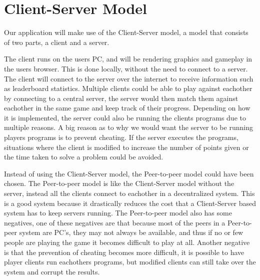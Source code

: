 \section{Client-Server Model}
Our application will make use of the Client-Server model, a model that consists of two parts, a client and a server.

The client runs on the users PC, and will be rendering graphics and gameplay in the users browser. This is done locally, without the need to connect to a server. The client will connect to the server over the internet to receive information such as leaderboard statistics. Multiple clients could be able to play against eachother by connecting to a central server, the server would then match them against eachother in the same game and keep track of their progress. Depending on how it is implemented, the server could also be running the clients programs due to multiple reasons. A big reason as to why we would want the server to be running players programs is to prevent cheating. If the server executes the programs, situations where the client is modified to increase the number of points given or the time taken to solve a problem could be avoided.

Instead of using the Client-Server model, the Peer-to-peer model could have been chosen. The Peer-to-peer model is like the Client-Server model without the server, instead all the clients connect to eachother in a decentralized system. This is a good system because it drastically reduces the cost that a Client-Server based system has to keep servers running. The Peer-to-peer model also has some negatives, one of these negatives are that because most of the peers in a Peer-to-peer system are PC's, they may not always be available, and thus if no or few people are playing the game it becomes difficult to play at all. Another negative is that the prevention of cheating becomes more difficult, it is possible to have player clients run eachothers programs, but modified clients can still take over the system and corrupt the results.